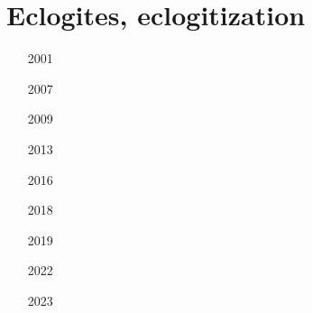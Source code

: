 \section{Eclogites, eclogitization}

\begin{small}
\begin{itemize}
\item[2001]
\item[2007]
\item[2009]
\item[2013]
\item[2016]
\item[2018]
\item[2019]
\item[2022]
\item[2023]
\item[\twothousandtwentyfour]
\end{itemize}
\end{small}







